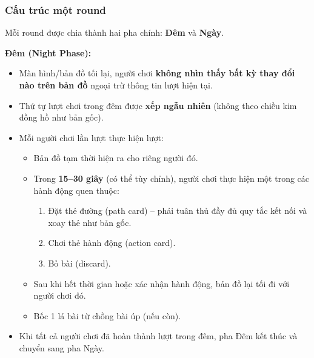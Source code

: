 \begin{frame}
\frametitle{Cấu trúc một round}

Mỗi round được chia thành hai pha chính: \textbf{Đêm} và \textbf{Ngày}.

\textbf{Đêm (Night Phase):}
\begin{itemize}
    \item Màn hình/bản đồ tối lại, người chơi \textbf{không nhìn thấy bất kỳ thay đổi nào trên bản đồ} ngoại trừ thông tin lượt hiện tại.
    \item Thứ tự lượt chơi trong đêm được \textbf{xếp ngẫu nhiên} (không theo chiều kim đồng hồ như bản gốc).
    \item Mỗi người chơi lần lượt thực hiện lượt:
\begin{itemize}
    \item Bản đồ tạm thời hiện ra cho riêng người đó.
    \item Trong \textbf{15--30 giây} (có thể tùy chỉnh), người chơi thực hiện một trong các hành động quen thuộc:
\begin{enumerate}
    \item Đặt thẻ đường (path card) – phải tuân thủ đầy đủ quy tắc kết nối và xoay thẻ như bản gốc.
    \item Chơi thẻ hành động (action card).
    \item Bỏ bài (discard).
\end{enumerate}
    \item Sau khi hết thời gian hoặc xác nhận hành động, bản đồ lại tối đi với người chơi đó.
    \item Bốc 1 lá bài từ chồng bài úp (nếu còn).
\end{itemize}
    \item Khi tất cả người chơi đã hoàn thành lượt trong đêm, pha Đêm kết thúc và chuyển sang pha Ngày.
\end{itemize}

\end{frame}

